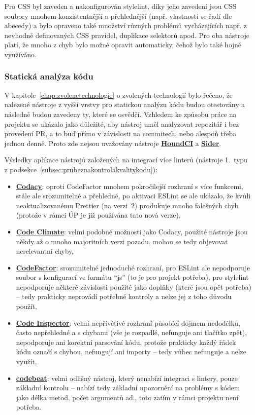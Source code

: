 Pro CSS byl zaveden a nakonfigurován stylelint, díky jeho zavedení jsou CSS soubory mnohem konzistentnější a přehlednější (např. vlastnosti se řadí dle abecedy) a bylo opraveno také množství různých problémů vycházejících např. z nevhodně definovaných CSS pravidel, duplikace selektorů apod. Pro oba nástroje platí, že mnoho z chyb bylo možné opravit automaticky, čehož bylo také hojně využíváno.

\subsubsection{Statická analýza kódu}

V kapitole~\ref{chap:zvolenetechnologie} o zvolených technologií bylo řečeno, že nalezené nástroje z vyšší vrstvy pro statickou analýzu kódu budou otestovány a následně budou zavedeny ty, které se osvědčí. Vzhledem ke způsobu práce na projektu se ukázalo jako důležité, aby nástroj uměl analyzovat repozitář i bez provedení PR, a to buď přímo v závislosti na commitech, nebo alespoň třeba jednou denně. Proto zde nejsou uvažovány nástroje \href{https://houndci.com}{\textbf{HoundCI}} a \href{https://sider.review}{\textbf{Sider}}.

Výsledky aplikace nástrojů založených na integrací více linterů (nástroje 1.~typu z podsekce~\ref{subsec:prubeznakontrolakvalitykodu}):
\begin{itemize}
    \item \href{https://www.codacy.com}{\textbf{Codacy}}: oproti CodeFactor mnohem pokročilejší rozhraní s více funkcemi, stále ale srozumitelné a přehledné, po aktivaci ESLint se ale ukázalo, že kvůli neaktualizovanému Prettier (na verzi~2) produkuje mnoho falešných chyb (protože v rámci ÚP je již používána tato nová verze),
    \item \href{https://codeclimate.com}{\textbf{Code Climate}}: velmi podobné možnosti jako Codacy, použité nástroje jsou někdy až o mnoho majoritních verzi pozadu, mohou se tedy objevovat nerelevantní chyby,
    \item \href{https://www.codefactor.io}{\textbf{CodeFactor}}: srozumitelné jednoduché rozhraní, pro ESLint ale nepodporuje soubor s konfigurací ve formátu \enquote{js} (to je pro projekt potřeba), pro stylelint nepodporuje některé závislosti použité jako doplňky (které jsou opět potřeba) -- tedy prakticky neprovádí potřebné kontroly a nelze jej z toho důvodu použít,
    \item \href{https://www.code-inspector.com}{\textbf{Code Inspector}}: velmi nepřívětivé rozhraní působící dojmem nedodělku, často nepřehledné a s chybami (vše je rozpadlé, nefunguje ani tlačítko zpět), nepodporuje ani korektní parsování kódu, protože prakticky každý řádek kódu označí s chybou, nefungují ani importy -- tedy vůbec nefunguje a nelze využít,
    \item \href{https://codebeat.co}{\textbf{codebeat}}: velmi odlišný nástroj, který nenabízí integraci s lintery, pouze základní kontrolu -- nabízí tedy základní upozornění na problémy s kódem jako délka metod, počet argumentů ad., toto zatím v rámci projektu není potřeba.
\end{itemize}

